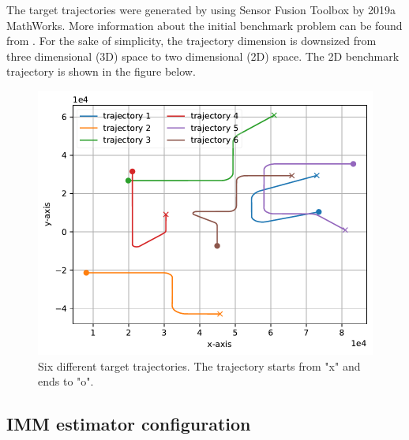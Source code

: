 \documentclass[english, 12pt, a4paper, elec, utf8, a-1b, online]{aaltothesis}
\begin{document}
The target trajectories were generated by using Sensor Fusion Toolbox by 2019a MathWorks.
More information about the initial benchmark problem can be found from \cite{Blair1998}. 
For the sake of simplicity, the trajectory dimension is downsized from three dimensional (3D) space to two dimensional (2D) space.
The 2D benchmark trajectory is shown in the figure below.
\begin{figure}
    \centering
    \includegraphics{figures/benchmark/trajectories.pdf}
    \caption{Six different target trajectories. The trajectory starts from "x" and ends to "o".}
    \label{fig:benchmark_trajectories}
\end{figure}


\subsection{IMM estimator configuration}

\newcommand{\diag}[1]{\text{diag}\left\{ #1 \right\}}
\end{document}

